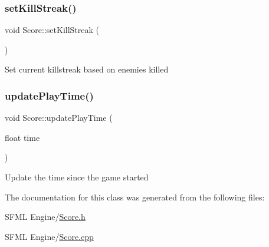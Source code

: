 \subsubsection{\texorpdfstring{set\+Kill\+Streak()}{setKillStreak()}}
{\footnotesize\ttfamily void Score\+::set\+Kill\+Streak (\begin{DoxyParamCaption}{ }\end{DoxyParamCaption})}

Set current killstreak based on enemies killed \mbox{\label{class_score_a767d18294e41930ccece6d48c2398537}} 
\subsubsection{\texorpdfstring{update\+Play\+Time()}{updatePlayTime()}}
{\footnotesize\ttfamily void Score\+::update\+Play\+Time (\begin{DoxyParamCaption}\item[{float}]{time }\end{DoxyParamCaption})}

Update the time since the game started 

The documentation for this class was generated from the following files\+:\begin{DoxyCompactItemize}
\item 
S\+F\+M\+L Engine/\hyperlink{_score_8h}{Score.\+h}\item 
S\+F\+M\+L Engine/\hyperlink{_score_8cpp}{Score.\+cpp}\end{DoxyCompactItemize}
